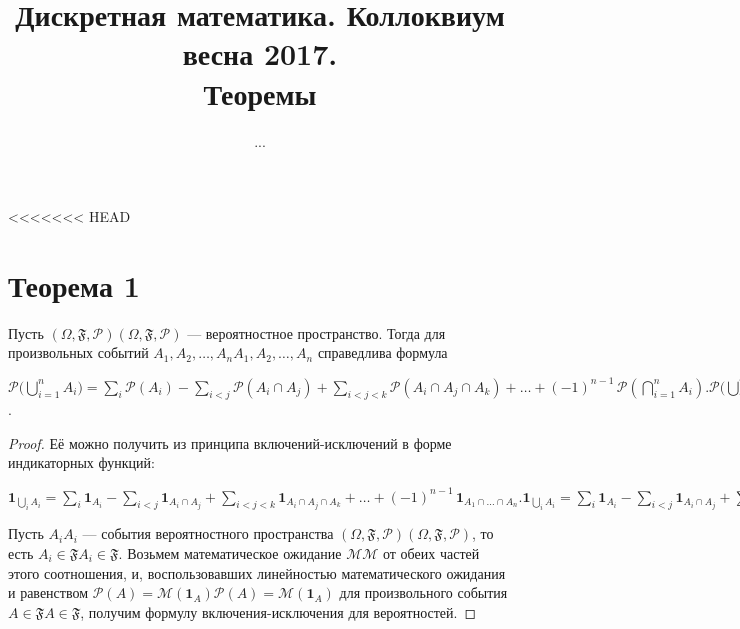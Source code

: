 \documentclass[a4paper,12pt]{article}
\begin{document}
	\title{Дискретная математика. Коллоквиум весна 2017. \\ Теоремы}
	\author{...}
	\maketitle
	\tableofcontents
    \pagebreak
<<<<<<< HEAD
    \section {Теорема 1}
    \begin{theorem}
   Пусть ${\displaystyle (\Omega ,{\mathfrak {F}},{\mathcal {P}})} (\Omega ,{\mathfrak {F}},{\mathcal {P}})$ — вероятностное пространство. Тогда для произвольных событий ${\displaystyle A_{1},A_{2},\ldots ,A_{n}} A_{1},A_{2},\ldots ,A_{n}$ справедлива формула

${\displaystyle {\mathcal {P}}{\biggl (}\bigcup _{i=1}^{n}A_{i}{\biggr )}=\sum _{i}{\mathcal {P}}(A_{i})-\sum _{i<j}{\mathcal {P}}(A_{i}\cap A_{j})+\sum _{i<j<k}{\mathcal {P}}(A_{i}\cap A_{j}\cap A_{k})+\ldots +(-1)^{n-1}\,{\mathcal {P}}\left(\bigcap _{i=1}^{n}A_{i}\right).} {\mathcal {P}}{\biggl (}\bigcup _{i=1}^{n}A_{i}{\biggr )}=\sum _{i}{\mathcal {P}}(A_{i})-\sum _{i<j}{\mathcal {P}}(A_{i}\cap A_{j})+\sum _{i<j<k}{\mathcal {P}}(A_{i}\cap A_{j}\cap A_{k})+\ldots +(-1)^{n-1}\,{\mathcal {P}}\left(\bigcap _{i=1}^{n}A_{i}\right)$.
    \end{theorem}
    \begin{proof}
    Её можно получить из принципа включений-исключений в форме индикаторных функций:

${\displaystyle \mathbf {1} _{\bigcup _{i}A_{i}}=\sum _{i}\mathbf {1} _{A_{i}}-\sum _{i<j}\mathbf {1} _{A_{i}\cap A_{j}}+\sum _{i<j<k}\mathbf {1} _{A_{i}\cap A_{j}\cap A_{k}}+\ldots +(-1)^{n-1}\,\mathbf {1} _{A_{1}\cap \ldots \cap A_{n}}.} \mathbf {1} _{\bigcup _{i}A_{i}}=\sum _{i}\mathbf {1} _{A_{i}}-\sum _{i<j}\mathbf {1} _{A_{i}\cap A_{j}}+\sum _{i<j<k}\mathbf {1} _{A_{i}\cap A_{j}\cap A_{k}}+\ldots +(-1)^{n-1}\,\mathbf {1} _{A_{1}\cap \ldots \cap A_{n}}.$

Пусть ${\displaystyle A_{i}} A_{i}$ — события вероятностного пространства ${\displaystyle (\Omega ,{\mathfrak {F}},{\mathcal {P}})} (\Omega ,{\mathfrak {F}},{\mathcal {P}})$, то есть ${\displaystyle A_{i}\in {\mathfrak {F}}} A_{i}\in {\mathfrak {F}}$. Возьмем математическое ожидание ${\displaystyle {\mathcal {M}}} {\mathcal {M}}$ от обеих частей этого соотношения, и, воспользовавших линейностью математического ожидания и равенством ${\displaystyle {\mathcal {P}}(A)={\mathcal {M}}(\mathbf {1} _{A})} {\mathcal {P}}(A)={\mathcal {M}}(\mathbf {1} _{A})$ для произвольного события ${\displaystyle A\in {\mathfrak {F}}} {\displaystyle A\in {\mathfrak {F}}}$, получим формулу включения-исключения для вероятностей.
    
    \end{proof}
    
\end{document}
